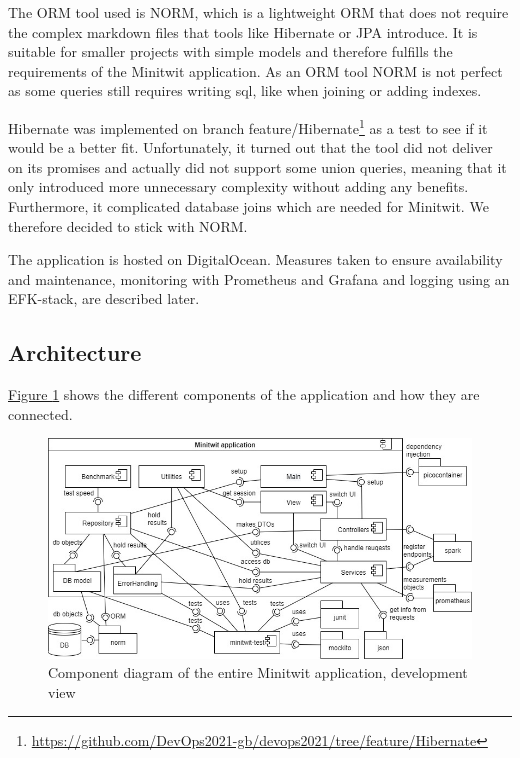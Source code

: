 \noindent
The ORM tool used is NORM, which is a lightweight ORM that does not require the complex markdown files that tools like Hibernate or JPA introduce. It is suitable for smaller projects with simple models and therefore fulfills the requirements of the Minitwit application. As an ORM tool NORM is not perfect as some queries still requires writing sql, like when joining or adding indexes.

Hibernate was implemented on branch feature/Hibernate\footnote{\url{https://github.com/DevOps2021-gb/devops2021/tree/feature/Hibernate}} as a test to see if it would be a better fit. Unfortunately, it turned out that the tool did not deliver on its promises and actually did not support some union queries, meaning that it only introduced more unnecessary complexity without adding any benefits. Furthermore, it complicated database joins which are needed for Minitwit. We therefore decided to stick with NORM.

The application is hosted on DigitalOcean. Measures taken to ensure availability and maintenance, monitoring with Prometheus and Grafana and logging using an EFK-stack, are described later.

\newpage
\subsection{Architecture}

\hyperref[fig:componentDiagram]{Figure \ref{fig:componentDiagram}} shows the different components of the application and how they are connected.
\begin{figure}[H]
    \centering
    \includegraphics[width=1\textwidth]{images/Diagrams-Development_view_component_diagram.jpg}
    \caption{Component diagram of the entire Minitwit application, development view}
    \label{fig:componentDiagram}
\end{figure}

